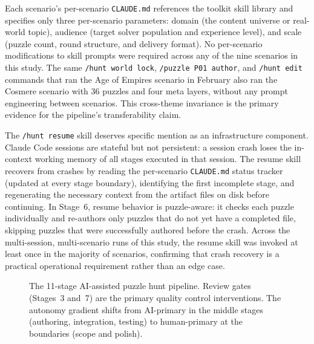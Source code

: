 Each scenario's per-scenario \texttt{CLAUDE.md} references the toolkit skill library
and specifies only three per-scenario parameters: domain (the content universe or real-world
topic), audience (target solver population and experience level), and scale (puzzle count,
round structure, and delivery format). No per-scenario modifications to skill prompts were
required across any of the nine scenarios in this study. The same \texttt{/hunt world lock},
\texttt{/puzzle P01 author}, and \texttt{/hunt edit} commands that ran the Age of Empires
scenario in February also ran the Cosmere scenario with 36 puzzles and four meta layers,
without any prompt engineering between scenarios. This cross-theme invariance is the
primary evidence for the pipeline's transferability claim.

The \texttt{/hunt resume} skill deserves specific mention as an infrastructure component.
Claude Code sessions are stateful but not persistent: a session crash loses the in-context
working memory of all stages executed in that session. The resume skill recovers from
crashes by reading the per-scenario \texttt{CLAUDE.md} status tracker (updated at every
stage boundary), identifying the first incomplete stage, and regenerating the necessary
context from the artifact files on disk before continuing. In Stage~6, resume behavior is
puzzle-aware: it checks each puzzle individually and re-authors only puzzles that do not
yet have a completed file, skipping puzzles that were successfully authored before the
crash. Across the multi-session, multi-scenario runs of this study, the resume skill was
invoked at least once in the majority of scenarios, confirming that crash recovery is a
practical operational requirement rather than an edge case.

\begin{figure}[h]
\centering
\caption{The 11-stage AI-assisted puzzle hunt pipeline. Review gates (Stages~3 and~7)
are the primary quality control interventions. The autonomy gradient shifts from
AI-primary in the middle stages (authoring, integration, testing) to human-primary at
the boundaries (scope and polish).}
\label{fig:pipeline}
\end{figure}
